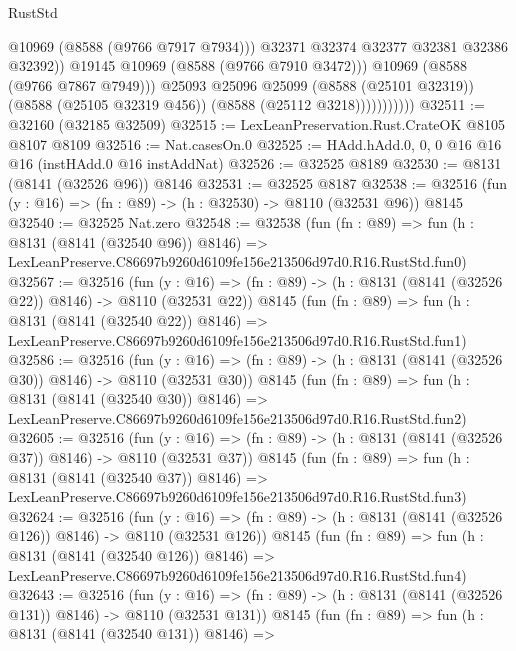 \begin{lexlean}{RustStd}
\begin{coremodule}
                                @10969
                                (@8588 (@9766 @7917 @7934)))
                              @32371
                              @32374
                              @32377
                              @32381
                              @32386
                              @32392))
                          @19145
                          @10969
                          (@8588 (@9766 @7910 @3472)))
                        @10969
                        (@8588 (@9766 @7867 @7949)))
                      @25093
                      @25096
                      @25099
                      (@8588 (@25101 @32319))
                      (@8588 (@25105 @32319 @456))
                      (@8588 (@25112 @3218)))))))))))
@32511 := @32160 (@32185 @32509)
@32515 := LexLeanPreservation.Rust.CrateOK @8105 @8107 @8109
@32516 := Nat.casesOn.{0}
@32525 := HAdd.hAdd.{0, 0, 0} @16 @16 @16 (instHAdd.{0} @16 instAddNat)
@32526 := @32525 @8189
@32530 := @8131 (@8141 (@32526 @96)) @8146
@32531 := @32525 @8187
@32538 := @32516 (fun (y : @16) => (fn : @89) -> (h : @32530) -> @8110 (@32531 @96)) @8145
@32540 := @32525 Nat.zero
@32548 := @32538
    (fun (fn : @89) =>
    fun (h : @8131 (@8141 (@32540 @96)) @8146) =>
    LexLeanPreserve.C86697b9260d6109fe156e213506d97d0.R16.RustStd.fun0)
@32567 := @32516
    (fun (y : @16) => (fn : @89) -> (h : @8131 (@8141 (@32526 @22)) @8146) -> @8110 (@32531 @22))
    @8145
    (fun (fn : @89) =>
    fun (h : @8131 (@8141 (@32540 @22)) @8146) =>
    LexLeanPreserve.C86697b9260d6109fe156e213506d97d0.R16.RustStd.fun1)
@32586 := @32516
    (fun (y : @16) => (fn : @89) -> (h : @8131 (@8141 (@32526 @30)) @8146) -> @8110 (@32531 @30))
    @8145
    (fun (fn : @89) =>
    fun (h : @8131 (@8141 (@32540 @30)) @8146) =>
    LexLeanPreserve.C86697b9260d6109fe156e213506d97d0.R16.RustStd.fun2)
@32605 := @32516
    (fun (y : @16) => (fn : @89) -> (h : @8131 (@8141 (@32526 @37)) @8146) -> @8110 (@32531 @37))
    @8145
    (fun (fn : @89) =>
    fun (h : @8131 (@8141 (@32540 @37)) @8146) =>
    LexLeanPreserve.C86697b9260d6109fe156e213506d97d0.R16.RustStd.fun3)
@32624 := @32516
    (fun (y : @16) => (fn : @89) -> (h : @8131 (@8141 (@32526 @126)) @8146) -> @8110 (@32531 @126))
    @8145
    (fun (fn : @89) =>
    fun (h : @8131 (@8141 (@32540 @126)) @8146) =>
    LexLeanPreserve.C86697b9260d6109fe156e213506d97d0.R16.RustStd.fun4)
@32643 := @32516
    (fun (y : @16) => (fn : @89) -> (h : @8131 (@8141 (@32526 @131)) @8146) -> @8110 (@32531 @131))
    @8145
    (fun (fn : @89) =>
    fun (h : @8131 (@8141 (@32540 @131)) @8146) =>

\end{coremodule}
\end{lexlean}
